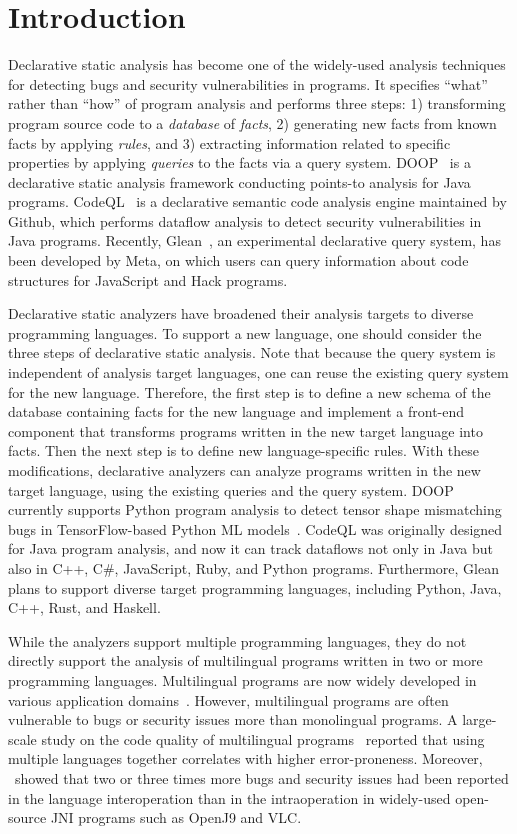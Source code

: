 \section{Introduction}
Declarative static analysis has become one of the widely-used analysis techniques
for detecting bugs and security vulnerabilities in programs.
It specifies ``what'' rather than ``how'' of program analysis and
performs three steps:
1) transforming program source code to a {\it database}
of {\it facts}, 2) generating new facts from known facts by applying
{\it rules}, and 3) extracting information related to specific properties by
applying {\it queries} to the facts via a query system.  DOOP~\cite{doop} is a
declarative static analysis framework conducting points-to analysis for Java
programs. CodeQL~\cite{codeql} is a declarative semantic code analysis engine
maintained by Github, which performs dataflow analysis to detect security
vulnerabilities in Java programs.  Recently, Glean~\cite{glean}, an experimental
declarative query system, has been developed by Meta, on which users can query
information about code structures for JavaScript and Hack programs.

Declarative static analyzers have broadened their analysis targets to diverse
programming languages. To support a new language, one should consider
the three steps of declarative static analysis. Note that because the query
system is independent of analysis target languages, one can reuse the
existing query system for the new language. Therefore, the first step
is to define a new schema of the database containing facts for the new
language and implement a
front-end component that transforms programs written in the new target language into facts.
Then the next step is to define new language-specific rules.  With these
modifications, declarative analyzers can analyze programs written in the new
target language, using the existing queries and the query system.  DOOP currently
supports Python program analysis to detect tensor shape mismatching bugs in
TensorFlow-based Python ML models~\cite{lagouvardos2020static}. CodeQL was
originally designed for Java program analysis, and now it can track dataflows not only
in Java but also in C++, C\#, JavaScript, Ruby, and Python programs.
Furthermore, Glean plans to support diverse target programming languages,
including Python, Java, C++, Rust, and Haskell.

While the analyzers support multiple programming languages, they do not directly
support the analysis of multilingual programs written in two or more
programming languages. Multilingual programs are now widely developed in
various application domains~\cite{kochhar2016large, mergendahlcross}. However,
multilingual programs are often vulnerable to bugs or security issues more than
monolingual programs. A large-scale study on the code quality of multilingual
programs~\cite{kochhar2016large} reported that using multiple languages
together correlates with higher error-proneness. Moreover,
\citet{grichi2020impact}~showed that two or three times more bugs and security
issues had been reported in the language interoperation than in the
intraoperation in widely-used open-source JNI programs such as OpenJ9 and VLC.

